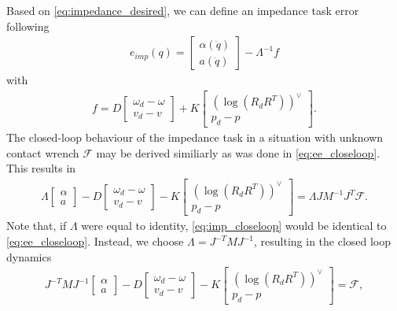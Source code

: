 \documentclass[a4paper, 10pt, conference]{ieeeconf}
\begin{document}
    Based on \eqref{eq:impedance_desired}, we can define an impedance task error following
     \begin{align} \label{eq:e_imp_} e_{imp}(q) = 
    \begin{bmatrix} \alpha(\ddot{q}) \\ a(\ddot{q}) \end{bmatrix}
    - \Lambda^{-1}f 
        \end{align}
        with 
    \begin{align} f =  D \begin{bmatrix} \omega_d - {\omega} \\ v_d - v \end{bmatrix}  + K \begin{bmatrix}(\log({R}_dR^T))^{\vee }  \\p_d - {p}  \end{bmatrix}.
        \end{align}
    The closed-loop behaviour of the impedance task in a situation with unknown contact wrench $\mathcal{F}$ may be derived similiarly as was done in \eqref{eq:ee_closeloop}. This results in
     \begin{align} \label{eq:imp_closeloop} 
    \Lambda \begin{bmatrix} \alpha \\ a \end{bmatrix}- D \begin{bmatrix} \omega_d - {}{\omega} \\ v_d - v \end{bmatrix}  - K \begin{bmatrix}(\log({R}_dR^T))^{\vee }  \\p_d - {p}  \end{bmatrix}=\Lambda JM^{-1}J^T\mathcal{F}.
      \end{align}
      Note that, if $\Lambda$ were equal to identity, \eqref{eq:imp_closeloop} would be identical to \eqref{eq:ee_closeloop}. Instead, we choose $\Lambda=J^{-T}MJ^{-1}$, resulting in the closed loop dynamics 
           \begin{align} \label{eq:imp_closeloop_} 
    J^{-T}MJ^{-1}\begin{bmatrix} \alpha \\ a \end{bmatrix}- D \begin{bmatrix} \omega_d - {}{\omega} \\ v_d - v \end{bmatrix}  - K \begin{bmatrix}(\log({R}_dR^T))^{\vee }  \\p_d - {p}  \end{bmatrix}=\mathcal{F},
      \end{align}
\end{document}
